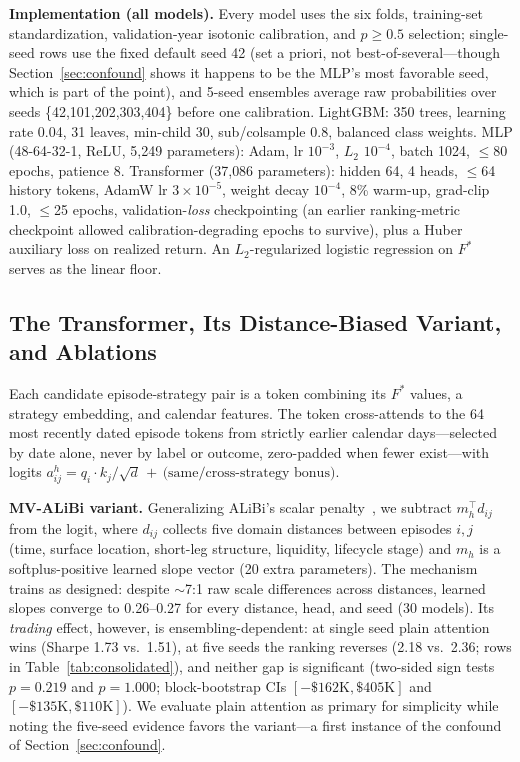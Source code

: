 \documentclass[sigconf,review,anonymous]{acmart}
\begin{document}
\noindent\textbf{Implementation (all models).} Every model uses the six folds, training-set standardization, validation-year isotonic calibration, and $p\ge0.5$ selection; single-seed rows use the fixed default seed 42 (set a priori, not best-of-several---though Section~\ref{sec:confound} shows it happens to be the MLP's most favorable seed, which is part of the point), and 5-seed ensembles average raw probabilities over seeds \{42,101,202,303,404\} before one calibration. LightGBM: 350 trees, learning rate 0.04, 31 leaves, min-child 30, sub/colsample 0.8, balanced class weights. MLP (48-64-32-1, ReLU, 5{,}249 parameters): Adam, lr $10^{-3}$, $L_2$ $10^{-4}$, batch 1024, $\le$80 epochs, patience 8. Transformer (37{,}086 parameters): hidden 64, 4 heads, $\le$64 history tokens, AdamW lr $3{\times}10^{-5}$, weight decay $10^{-4}$, 8\% warm-up, grad-clip 1.0, $\le$25 epochs, validation-\emph{loss} checkpointing (an earlier ranking-metric checkpoint allowed calibration-degrading epochs to survive), plus a Huber auxiliary loss on realized return. An $L_2$-regularized logistic regression on $F^{\ast}$ serves as the linear floor.

\subsection{The Transformer, Its Distance-Biased Variant, and Ablations}
\label{sec:transformer}
Each candidate episode-strategy pair is a token combining its $F^{\ast}$ values, a strategy embedding, and calendar features. The token cross-attends to the 64 most recently dated episode tokens from strictly earlier calendar days---selected by date alone, never by label or outcome, zero-padded when fewer exist---with logits
$a^{h}_{ij}=q_i\!\cdot\!k_j/\sqrt{d}\,+\,\text{(same/cross-strategy bonus)}$.

\noindent\textbf{MV-ALiBi variant.} Generalizing ALiBi's scalar penalty~\cite{press2022alibi}, we subtract $m_h^{\top}d_{ij}$ from the logit, where $d_{ij}$ collects five domain distances between episodes $i,j$ (time, surface location, short-leg structure, liquidity, lifecycle stage) and $m_h$ is a softplus-positive learned slope vector (20 extra parameters). The mechanism trains as designed: despite $\sim$7:1 raw scale differences across distances, learned slopes converge to 0.26--0.27 for every distance, head, and seed (30 models). Its \emph{trading} effect, however, is ensembling-dependent: at single seed plain attention wins (Sharpe 1.73 vs.\ 1.51), at five seeds the ranking reverses (2.18 vs.\ 2.36; rows in Table~\ref{tab:consolidated}), and neither gap is significant (two-sided sign tests $p=0.219$ and $p=1.000$; block-bootstrap CIs $[-\$162\text{K},\$405\text{K}]$ and $[-\$135\text{K},\$110\text{K}]$). We evaluate plain attention as primary for simplicity while noting the five-seed evidence favors the variant---a first instance of the confound of Section~\ref{sec:confound}.
\end{document}
